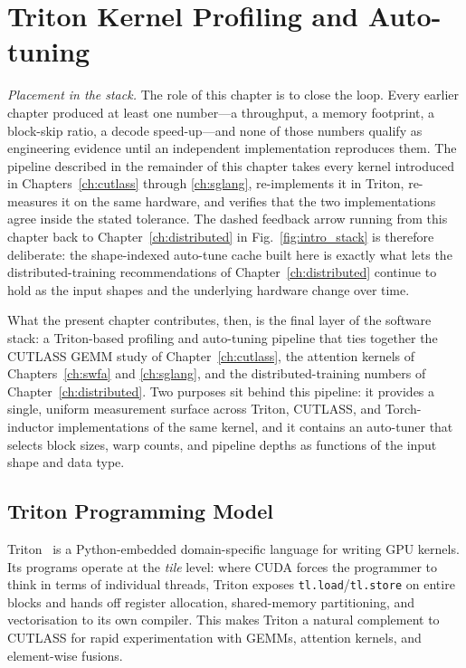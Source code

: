 \chapter{Triton Kernel Profiling and Auto-tuning}\label{ch:triton}

\emph{Placement in the stack.} The role of this chapter is to
close the loop. Every earlier chapter produced at least one
number---a throughput, a memory footprint, a block-skip ratio, a
decode speed-up---and none of those numbers qualify as engineering
evidence until an independent implementation reproduces them. The
pipeline described in the remainder of this chapter takes every
kernel introduced in Chapters~\ref{ch:cutlass} through
\ref{ch:sglang}, re-implements it in Triton, re-measures it on
the same hardware, and verifies that the two implementations
agree inside the stated tolerance. The dashed feedback arrow
running from this chapter back to Chapter~\ref{ch:distributed} in
Fig.~\ref{fig:intro_stack} is therefore deliberate: the
shape-indexed auto-tune cache built here is exactly what lets the
distributed-training recommendations of
Chapter~\ref{ch:distributed} continue to hold as the input
shapes and the underlying hardware change over time.

What the present chapter contributes, then, is the final layer of
the software stack: a Triton-based profiling and auto-tuning
pipeline that ties together the CUTLASS GEMM study of
Chapter~\ref{ch:cutlass}, the attention kernels of
Chapters~\ref{ch:swfa} and \ref{ch:sglang}, and the
distributed-training numbers of Chapter~\ref{ch:distributed}. Two
purposes sit behind this pipeline: it provides a single,
uniform measurement surface across Triton, CUTLASS, and
Torch-inductor implementations of the same kernel, and it
contains an auto-tuner that selects block sizes, warp counts, and
pipeline depths as functions of the input shape and data type.

\section{Triton Programming Model}\label{sec:triton_model}
Triton~\cite{tillet2019triton} is a Python-embedded domain-specific
language for writing GPU kernels. Its programs operate at the
\emph{tile} level: where CUDA forces the programmer to think in
terms of individual threads, Triton exposes
\texttt{tl.load}/\texttt{tl.store} on entire blocks and hands off
register allocation, shared-memory partitioning, and vectorisation
to its own compiler. This makes Triton a natural complement to
CUTLASS for rapid experimentation with GEMMs, attention kernels,
and element-wise fusions.

